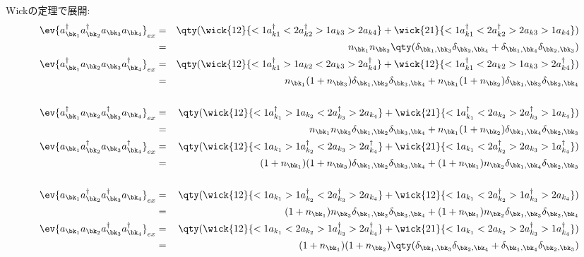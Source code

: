 \documentclass[10.5pt,a4paper]{jreport}
\begin{document}
Wickの定理で展開:
\begin{eqnarray}
  \nonumber  \ev{a^\dagger_{\bk_1}a^\dagger_{\bk_2}a_{\bk_3}a_{\bk_4}}_{ex} &=& \qty(\wick{12}{<1a^\dagger_{k1}<2a^\dagger_{k2}>1a_{k3}>2a_{k4}} + \wick{21}{<1a^\dagger_{k1}<2a^\dagger_{k2}>2a_{k3}>1a_{k4}})\\
  &=& n_{\bk_1}n_{\bk_2}\qty(\delta_{\bk_1, \bk_3}\delta_{\bk_2, \bk_4} + \delta_{\bk_1, \bk_4}\delta_{\bk_2, \bk_3})\\
  \nonumber  \ev{a^\dagger_{\bk_1}a_{\bk_2}a_{\bk_3}a^\dagger_{\bk_4}}_{ex} &=& \qty(\wick{12}{<1a^\dagger_{k1}>1a_{k2}<2a_{k3}>2a^\dagger_{k4}} + \wick{12}{<1a^\dagger_{k1}<2a_{k2}>1a_{k3}>2a^\dagger_{k4}})\\
  \nonumber&=& n_{\bk_1}(1 + n_{\bk_3})\delta_{\bk_1, \bk_2}\delta_{\bk_3, \bk_4} + n_{\bk_1}(1 + n_{\bk_2})\delta_{\bk_1, \bk_3}\delta_{\bk_2, \bk_4}\\
  \\
  \nonumber  \ev{a^\dagger_{\bk_1}a_{\bk_2}a^\dagger_{\bk_3}a_{\bk_4}}_{ex} &=& \qty(\wick{12}{ <1a^\dagger_{k_1}>1a_{k_2}<2a^\dagger_{k_3}>2a_{k_4}} + \wick{21}{<1a^\dagger_{k_1}<2a_{k_2}>2a^\dagger_{k_3}>1a_{k_4}})\\
  &=& n_{\bk_1}n_{\bk_3}\delta_{\bk_1, \bk_2}\delta_{\bk_3, \bk_4} + n_{\bk_1}(1 + n_{\bk_2})\delta_{\bk_1, \bk_4}\delta_{\bk_2, \bk_3}\\
  \nonumber  \ev{a_{\bk_1}a^\dagger_{\bk_2}a_{\bk_3}a^\dagger_{\bk_4}}_{ex} &=& \qty(\wick{12}{<1a_{k_1}>1a^\dagger_{k_2}<2a_{k_3}>2a^\dagger_{k_4}} + \wick{21}{<1a_{k_1}<2a^\dagger_{k_2}>2a_{k_3}>1a^\dagger_{k_4}})\\
  \nonumber&=& (1+n_{\bk_1})(1+n_{\bk_3})\delta_{\bk_1, \bk_2}\delta_{\bk_3, \bk_4} + (1+n_{\bk_1})n_{\bk_2}\delta_{\bk_1, \bk_4}\delta_{\bk_2, \bk_3}\\
  \\
  \nonumber  \ev{a_{\bk_1}a^\dagger_{\bk_2}a^\dagger_{\bk_3}a_{\bk_4}}_{ex} &=& \qty(\wick{12}{<1a_{k_1}>1a^\dagger_{k_2}<2a^\dagger_{k_3}>2a_{k_4}} + \wick{12}{<1a_{k_1}<2a^\dagger_{k_2}>1a^\dagger_{k_3}>2a_{k_4}})\\
  &=& (1 + n_{\bk_1})n_{\bk_3}\delta_{\bk_1, \bk_2}\delta_{\bk_3, \bk_4} + (1 + n_{\bk_1})n_{\bk_2}\delta_{\bk_1, \bk_3}\delta_{\bk_2, \bk_4}\\
  \nonumber  \ev{a_{\bk_1}a_{\bk_2}a^\dagger_{\bk_3}a^\dagger_{\bk_4}}_{ex} &=& \qty(\wick{12}{<1a_{k_1}<2a_{k_2}>1a^\dagger_{k_3}>2a^\dagger_{k_4}} + \wick{21}{<1a_{k_1}<2a_{k_2}>2a^\dagger_{k_3}>1a^\dagger_{k_4}})\\
  &=& (1 + n_{\bk_1})(1 + n_{\bk_2})\qty(\delta_{\bk_1, \bk_3}\delta_{\bk_2, \bk_4} + \delta_{\bk_1, \bk_4}\delta_{\bk_2, \bk_3})
\end{eqnarray}
\end{document}
